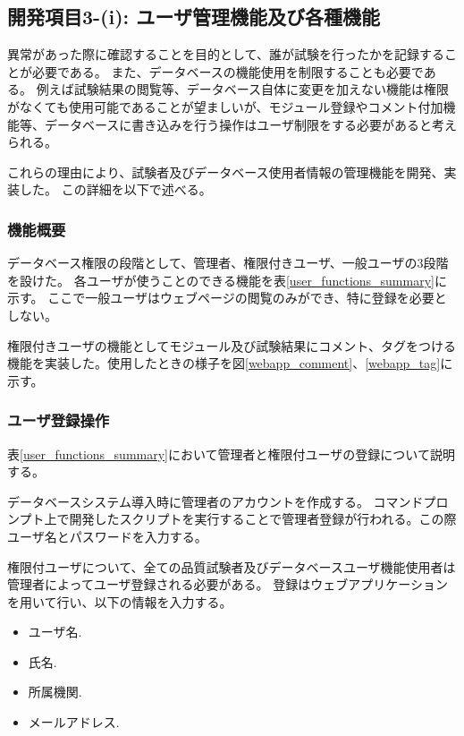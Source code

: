 \clearpage

\subsection{開発項目3-(i): ユーザ管理機能及び各種機能}\label{sec:user_management_function}

異常があった際に確認することを目的として、誰が試験を行ったかを記録することが必要である。
また、データベースの機能使用を制限することも必要である。
例えば試験結果の閲覧等、データベース自体に変更を加えない機能は権限がなくても使用可能であることが望ましいが、モジュール登録やコメント付加機能等、データベースに書き込みを行う操作はユーザ制限をする必要があると考えられる。

これらの理由により、試験者及びデータベース使用者情報の管理機能を開発、実装した。
この詳細を以下で述べる。

\subsubsection{機能概要}
データベース権限の段階として、管理者、権限付きユーザ、一般ユーザの3段階を設けた。
各ユーザが使うことのできる機能を表\ref{user_functions_summary}に示す。
ここで一般ユーザはウェブページの閲覧のみができ、特に登録を必要としない。

権限付きユーザの機能としてモジュール及び試験結果にコメント、タグをつける機能を実装した。使用したときの様子を図\ref{webapp_comment}、\ref{webapp_tag}に示す。

\subsubsection{ユーザ登録操作}
表\ref{user_functions_summary}において管理者と権限付ユーザの登録について説明する。

データベースシステム導入時に管理者のアカウントを作成する。
コマンドプロンプト上で開発したスクリプトを実行することで管理者登録が行われる。この際ユーザ名とパスワードを入力する。

権限付ユーザについて、全ての品質試験者及びデータベースユーザ機能使用者は管理者によってユーザ登録される必要がある。
登録はウェブアプリケーションを用いて行い、以下の情報を入力する。
\begin{itemize}
  \item ユーザ名. 
  \item 氏名.
  \item 所属機関.
  \item メールアドレス.
\end{itemize}

